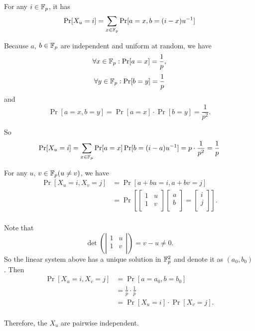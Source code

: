 \item
	For any $ i\in\mathbb{F}_{p} $, it has 
	\[
		\begin{aligned}
			\Pr[X_{u} = i] &= \sum_{x\in \mathbb{F}_{p}}\Pr[a = x, b = (i - x)u^{-1}] \\
		\end{aligned}
	\]	
	
	Because $ a $, $ b \in \mathbb{F}_{p}$ are independent and uniform at random, we have
	\[ \forall x \in \mathbb{F}_{p}:\Pr[a = x] = \frac{1}{p}, \] \[ \forall y\in\mathbb{F}_{p}:\Pr[b = y] = \frac{1}{p} \] and \[ \Pr[a = x, b = y] = \Pr[a = x]\cdot\Pr[b = y] = \frac{1}{p^{2}}. \]
	
	So \[ \Pr[X_{u} = i] = \sum_{x\in \mathbb{F}_{p}}\Pr[a = x]\Pr[b = (i - a)u^{-1}] = p\cdot\frac{1}{p^{2}} = \frac{1}{p} \]
	
	For any $ u $, $ v\in\mathbb{F}_{p} (u\neq v)$, we have
	\[ 
		\begin{aligned}
			\Pr[X_{u} = i,X_{v} = j] &= \Pr[a + bu = i, a + bv = j] \\
			                         &= \Pr[\left[\begin{matrix}
				                         1 & u \\
				                         1 & v \\
			                         \end{matrix}\right]\left[\begin{matrix}
				                         a \\
				                         b \\
			                         \end{matrix}\right] = \left[\begin{matrix}
				                         i \\
				                         j \\
			                         \end{matrix}\right]]. \\
		\end{aligned}
	\]
	
	Note that
	\[ \det(\left|\begin{matrix}
	1 & u \\
	1 & v \\
	\end{matrix}\right|) = v - u \neq 0. \]
	So the linear system above has a unique solution in $ \mathbb{F}_{p}^{2} $ and denote it as $ (a_{0}, b_{0}) $. 
	Then 
	\[
		\begin{aligned}
			\Pr[X_{u} = i,X_{v} = j] &= \Pr[a = a_{0}, b = b_{0}] \\
			                         &= \frac{1}{p}\cdot\frac{1}{p} \\
			                         &= \Pr[X_{u} = i]\cdot\Pr[X_{v} = j]. \\
		\end{aligned}
	\]
	
	Therefore, the $ X_{u} $ are pairwise independent.